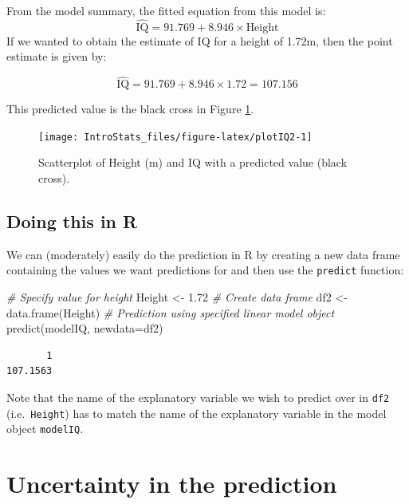 \documentclass[
  oneside]{krantz}
\newenvironment{Shaded}{\begin{snugshade}}{\end{snugshade}}
\newcommand{\AttributeTok}[1]{\textcolor[rgb]{0.77,0.63,0.00}{#1}}
\newcommand{\CommentTok}[1]{\textcolor[rgb]{0.56,0.35,0.01}{\textit{#1}}}
\newcommand{\FloatTok}[1]{\textcolor[rgb]{0.00,0.00,0.81}{#1}}
\newcommand{\FunctionTok}[1]{\textcolor[rgb]{0.00,0.00,0.00}{#1}}
\newcommand{\NormalTok}[1]{#1}
\newcommand{\OtherTok}[1]{\textcolor[rgb]{0.56,0.35,0.01}{#1}}
\begin{document}
From the model summary, the fitted equation from this model is:
\[\hat {\textrm{IQ}} = 91.769+8.946 \times \textrm{Height}\]
If we wanted to obtain the estimate of IQ for a height of 1.72m, then the point estimate is given by:

\[\hat {\textrm{IQ}} =91.769 + 8.946 \times 1.72 = 107.156\]

This predicted value is the black cross in Figure \ref{fig:plotIQ2}.

\begin{figure}

{\centering \texttt{[image: IntroStats\_files/figure-latex/plotIQ2-1]} 

}

\caption{Scatterplot of Height (m) and IQ with a predicted value (black cross).}\label{fig:plotIQ2}
\end{figure}

\hypertarget{doing-this-in-r-27}{%
\subsection{Doing this in R}\label{doing-this-in-r-27}}

We can (moderately) easily do the prediction in R by creating a new data frame containing the values we want predictions for and then use the \texttt{predict} function:

\begin{Shaded}
\begin{Highlighting}[]
\CommentTok{\# Specify value for height}
\NormalTok{Height }\OtherTok{\textless{}{-}} \FloatTok{1.72}
\CommentTok{\# Create data frame}
\NormalTok{df2 }\OtherTok{\textless{}{-}} \FunctionTok{data.frame}\NormalTok{(Height)}
\CommentTok{\# Prediction using specified linear model object}
\FunctionTok{predict}\NormalTok{(modelIQ, }\AttributeTok{newdata=}\NormalTok{df2)}
\end{Highlighting}
\end{Shaded}

\begin{verbatim}
       1 
107.1563 
\end{verbatim}

Note that the name of the explanatory variable we wish to predict over in \texttt{df2} (i.e.~\texttt{Height}) has to match the name of the explanatory variable in the model object \texttt{modelIQ}.

\hypertarget{uncertainty-in-the-prediction}{%
\section{Uncertainty in the prediction}\label{uncertainty-in-the-prediction}}
\end{document}

